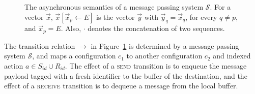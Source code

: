 \begin{figure} [t]
\footnotesize{
  \centering
  \begin{mathpar}
    
    
  \end{mathpar}
  }
  \caption{The asynchronous semantics of a message passing system $\mathcal{S}$. For a vector $\vec{x}$, $\vec{x}[\vec{x}_p\gets E]$ is the vector $\vec{y}$ with $\vec{y}_q=\vec{x}_q$, for every $q\neq p$, and $\vec{x}_p=E$. Also, $\cdot$ denotes the concatenation of two sequences.
  }
  \label{fig:asynch-sem}
\end{figure}

The transition relation $\rightarrow$ in Figure~\ref{fig:asynch-sem} is determined by a message passing system $\mathcal{S}$, and maps
a configuration $c_1$ to another configuration $c_2$ and indexed action $a\in S_{id}\cup R_{id}$.
The effect of a \textsc{send} transition is to enqueue the message payload tagged with a fresh identifier to the buffer of the destination, and the effect of a \textsc{receive} transition is to dequeue a message from the local buffer.

